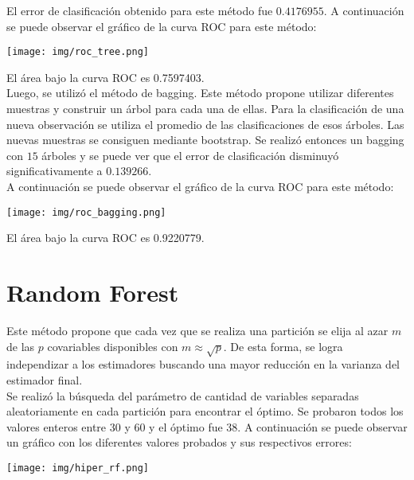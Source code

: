 \documentclass{article}
\begin{document}
\noindent
El error de clasificación obtenido para este método fue $0.4176955$. A continuación se puede observar el gráfico de la curva ROC para este método:\\

\begin{center}
    \texttt{[image: img/roc\_tree.png]}
\end{center}

\noindent
El área bajo la curva ROC es 0.7597403.\\

\noindent
Luego, se utilizó el método de bagging. Este método propone utilizar diferentes muestras y construir un árbol para cada una de ellas. Para la clasificación de una nueva observación se utiliza el promedio de las clasificaciones de esos árboles. Las nuevas muestras se consiguen mediante bootstrap. Se realizó entonces un bagging con $15$ árboles y se puede ver que el error de clasificación disminuyó significativamente a $0.139266$.\\

\noindent
A continuación se puede observar el gráfico de la curva ROC para este método:\\

\begin{center}
    \texttt{[image: img/roc\_bagging.png]}
\end{center}

\noindent
El área bajo la curva ROC es 0.9220779.\\


\section{Random Forest}
Este método propone que cada vez que se realiza una partición se elija al azar $m$ de las $p$ covariables disponibles con $m \approx \sqrt{p} $. De esta forma, se logra independizar a los estimadores buscando una mayor reducción en la varianza del estimador final.\\

\noindent
Se realizó la búsqueda del parámetro de cantidad de variables separadas aleatoriamente en cada partición para encontrar el óptimo. Se probaron todos los valores enteros entre 30 y 60 y el óptimo fue 38. A continuación se puede observar un gráfico con los diferentes valores probados y sus respectivos errores:\\

\begin{center}
    \texttt{[image: img/hiper\_rf.png]}
\end{center}
\end{document}
